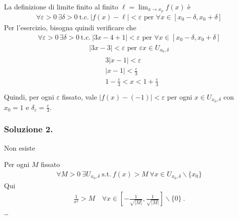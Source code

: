 \documentclass[letterpaper,10pt,italian]{jupyterBook}
\begin{document}
\sphinxAtStartPar
La definizione di limite finito al finito \(\ell = \lim_{x \rightarrow x_0} f(x)\) è
\begin{equation*}
\begin{split}\forall \varepsilon > 0 \, \exists \delta > 0 \ \text{t.c.} \ |f(x) - \ell| < \varepsilon \text{ per } \forall x \in [x_0-\delta,x_0+\delta]\end{split}
\end{equation*}
\sphinxAtStartPar
Per l’esercizio, bisogna quindi verificare che
\begin{equation*}
\begin{split}\forall \varepsilon > 0 \, \exists \delta > 0 \ \text{t.c.} \ |3x-4 + 1| < \varepsilon \text{ per } \forall x \in [x_0-\delta,x_0+\delta]\end{split}
\end{equation*}\begin{equation*}
\begin{split}|3x - 3| < \varepsilon \text{ per } \varepsilon x \in U_{x_0, \delta}\end{split}
\end{equation*}\begin{equation*}
\begin{split}\begin{aligned}
  & 3|x-1| < \varepsilon \\
  & |x-1| < \frac{\varepsilon}{3} \\
  & 1-\frac{\varepsilon}{3} < x < 1 + \frac{\varepsilon}{3} \\
\end{aligned}\end{split}
\end{equation*}
\sphinxAtStartPar
Quindi, per ogni \(\varepsilon\) fissato, vale \(|f(x) - (-1)| < \varepsilon\) per ogni \(x \in U_{x_0, \delta}\) con \(x_0 = 1\) e \(\delta_\varepsilon = \frac{\varepsilon}{3}\).
\subsubsection*{Soluzione 2.}

\sphinxAtStartPar
{} Non esiste 

\sphinxAtStartPar
{}

\sphinxAtStartPar
Per ogni \(M\) fissato
\begin{equation*}
\begin{split}\forall M > 0 \ \exists U_{x_0, \delta} \ \text{s.t.} \ f(x) > M \ \forall x \in U_{x_0, \delta} \backslash \{ x_0 \}\end{split}
\end{equation*}
\sphinxAtStartPar
Qui
\begin{equation*}
\begin{split}\frac{1}{x^2} > M \quad  \forall x \in \left[ -\frac{1}{\sqrt{|M|}}, \frac{1}{\sqrt{|M|}} \right] \backslash \{ 0 \} \ .\end{split}
\end{equation*}
\sphinxAtStartPar
…
\end{document}
